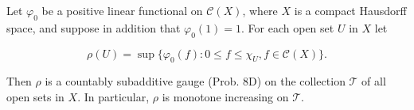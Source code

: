 Let $\varphi_0$ be a positive linear functional on $\mathcal{C}(X)$, where $X$ is a compact Hausdorff space, and suppose in addition that $\varphi_0(1) = 1$. For each open set $U$ in $X$ let

$$\rho(U) = \sup\{\varphi_0(f): 0 \leq f \leq \chi_U, f \in \mathcal{C}(X)\}.$$

Then $\rho$ is a countably subadditive gauge (Prob. 8D) on the collection $\mathcal{T}$ of all open sets in $X$. In particular, $\rho$ is monotone increasing on $\mathcal{T}$.
